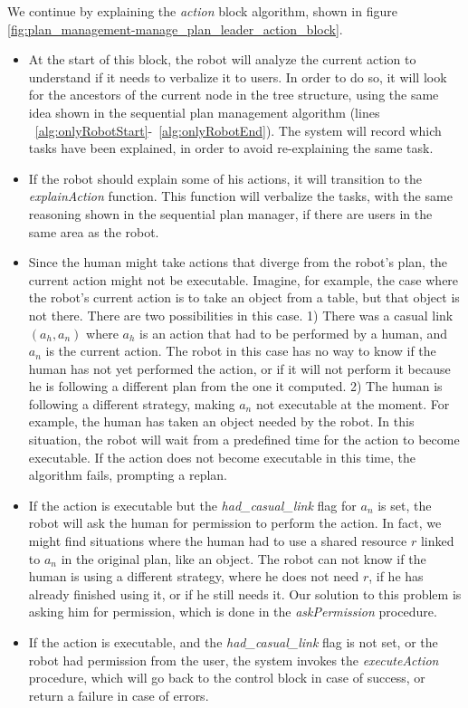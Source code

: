 We continue by explaining the \textit{action} block algorithm, shown in figure \ref{fig:plan_management-manage_plan_leader_action_block}.
\begin{itemize}
\item At the start of this block, the robot will analyze the current action to understand if it needs to verbalize it to users. In order to do so, it will look for the ancestors of the current node in the tree structure, using the same idea shown in the sequential plan management algorithm (lines ~\ref{alg:onlyRobotStart}-~\ref{alg:onlyRobotEnd}). The system will record which tasks have been explained, in order to avoid re-explaining the same task.
\item If the robot should explain some of his actions, it will transition to the \textit{explainAction} function. This function will verbalize the tasks, with the same reasoning shown in the sequential plan manager, if there are users in the same area as the robot.
\item Since the human might take actions that diverge from the robot's plan, the current action might not be executable. Imagine, for example, the case where the robot's current action is to take an object from a table, but that object is not there. There are two possibilities in this case. 1) There was a casual link $(a_h,a_n)$ where $a_h$ is an action that had to be performed by a human, and $a_n$ is the current action. The robot in this case has no way to know if the human has not yet performed the action, or if it will not perform it because he is following a different plan from the one it computed. 2) The human is following a different strategy, making $a_n$ not executable at the moment. For example, the human has taken an object needed by the robot. In this situation, the robot will wait from a predefined time for the action to become executable. If the action does not become executable in this time, the algorithm fails, prompting a replan.
\item If the action is executable but the \textit{had\_casual\_link} flag for $a_n$ is set, the robot will ask the human for permission to perform the action. In fact, we might find situations where the human had to use a shared resource $r$ linked to $a_n$ in the original plan, like an object. The robot can not know if the human is using a different strategy, where he does not need $r$, if he has already finished using it, or if he still needs it. Our solution to this problem is asking him for permission, which is done in the \textit{askPermission} procedure. 
\item If the action is executable, and the \textit{had\_casual\_link} flag is not set, or the robot had permission from the user, the system invokes the \textit{executeAction} procedure, which will go back to the control block in case of success, or return a failure in case of errors. 
\end{itemize}


